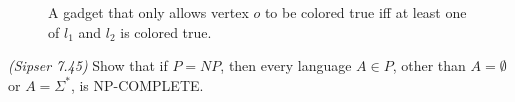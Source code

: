 \documentclass{exam}
\theoremstyle{definition}
\begin{document}
\begin{questions}
    \begin{figure}
        \centering
        \caption{A gadget that only allows vertex $o$ to be colored true iff at least one of $l_1$ and $l_2$ is colored true.}
        \label{fig:ORGadget}
    \end{figure}

    \question \textit{(Sipser 7.45)} Show that if $P = NP$, then every language $A \in P$, other than $A=\emptyset$ or $A = \Sigma^*$, is NP-COMPLETE.
\end{questions}
\end{document}
